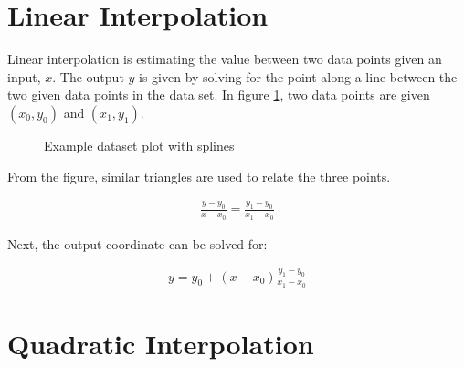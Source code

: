 \section{Linear Interpolation}

Linear interpolation is estimating the value between two data points given an input, $x$. The output $y$ is given by solving for the point along a line between the two given data points in the data set. In figure \ref{fig:linear}, two data points are given $(x_0,y_0)$ and $(x_1,y_1)$. 


\begin{figure}[H]
\begin{center}
\caption{Example dataset plot with splines}
\label{fig:linear}
\end{center}
\end{figure}

From the figure, similar triangles are used to relate the three points.

\begin{align}
	\frac{y-y_0}{x-x_0} 
	= \frac{y_1-y_0}{x_1-x_0}
\end{align}

Next, the output coordinate can be solved for:

\begin{align}
	y=y_0 + (x-x_0)\frac{y_1-y_0}{x_1-x_0}
\end{align}


\section{Quadratic Interpolation}